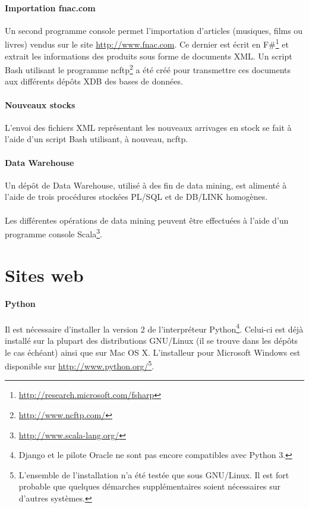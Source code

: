 \documentclass[a4paper,12pt,french]{article}
\begin{document}
    \paragraph{Importation fnac.com}
    Un second programme console permet l'importation d'articles (musiques, films
ou livres) vendus sur le site \url{http://www.fnac.com}. Ce dernier est écrit en
F\#\footnote{\url{http://research.microsoft.com/fsharp}} et extrait les
informations des produits sous forme de documents XML. Un script Bash utilisant
le programme ncftp\footnote{\url{http://www.ncftp.com/}} a été créé pour
transmettre ces documents aux différents dépôts XDB des bases de données.

    \paragraph{Nouveaux stocks}
    L'envoi des fichiers XML représentant les nouveaux arrivages en stock se
fait à l'aide d'un script Bash utilisant, à nouveau, ncftp.

    \paragraph{Data Warehouse}
    Un dépôt de Data Warehouse, utilisé à des fin de data mining, est alimenté
à l'aide de trois procédures stockées PL/SQL et de DB/LINK homogènes.

    \paragraph{}
    Les différentes opérations de data mining peuvent être effectuées à l'aide
d'un programme console Scala\footnote{\url{http://www.scala-lang.org/}}.

\section{Sites web}
    \paragraph{Python}
    Il est nécessaire d'installer la version 2 de l'interpréteur
Python\footnote{Django et le pilote Oracle ne sont pas encore compatibles avec
Python 3.}. Celui-ci est déjà installé sur la plupart des distributions
GNU/Linux (il se trouve dans les dépôts le cas échéant) ainsi que sur Mac OS X.
L'installeur pour Microsoft Windows est disponible sur
\url{http://www.python.org/}\footnote{L'ensemble de l'installation n'a été
testée que sous GNU/Linux. Il est fort probable que quelques démarches
supplémentaires soient nécessaires sur d'autres systèmes.}.
    
\end{document}
